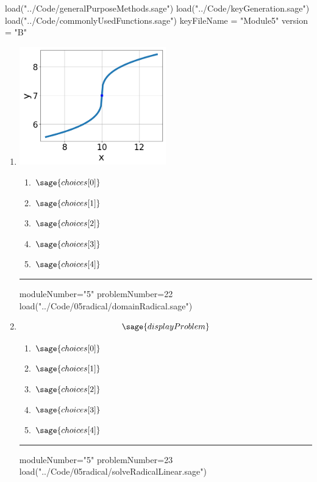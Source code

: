\documentclass[14pt]{extbook}
\newcommand{\litem}[1]{\item#1\hspace*{-1cm}\rule{\textwidth}{0.4pt}}
\begin{document}
\pagestyle{fancy}

\begin{sagesilent}
load("../Code/generalPurposeMethods.sage")
load("../Code/keyGeneration.sage")
load("../Code/commonlyUsedFunctions.sage")
keyFileName = "Module5"
version = "B"
\end{sagesilent}

\begin{enumerate}


  \begin{sagesilent}
  moduleNumber="5"
  problemNumber=21
  load("../Code/05radical/radicalGraphToEquation.sage")
  \end{sagesilent}

  \litem{ 

   \begin{center}
       \includegraphics[width=0.5\textwidth]{../Figures/radicalGraphToEquationB.png}
   \end{center}

  	\begin{enumerate}[label=\Alph*.]
    \item \( \sage{choices[0]} \)
    \item \( \sage{choices[1]} \)
    \item \( \sage{choices[2]} \)
    \item \( \sage{choices[3]} \)
    \item \( \sage{choices[4]} \)
  	\end{enumerate}
  }
\begin{sagesilent}
moduleNumber="5"
problemNumber=22
load("../Code/05radical/domainRadical.sage")
\end{sagesilent}

\litem{ 

   \[ \sage{displayProblem} \]

  	\begin{enumerate}[label=\Alph*.]
    \item \( \sage{choices[0]} \)
    \item \( \sage{choices[1]} \)
    \item \( \sage{choices[2]} \)
    \item \( \sage{choices[3]} \)
    \item \( \sage{choices[4]} \)
  	\end{enumerate}
  }
\begin{sagesilent}
moduleNumber="5"
problemNumber=23
load("../Code/05radical/solveRadicalLinear.sage")
\end{sagesilent}


\end{enumerate}
\end{document}
